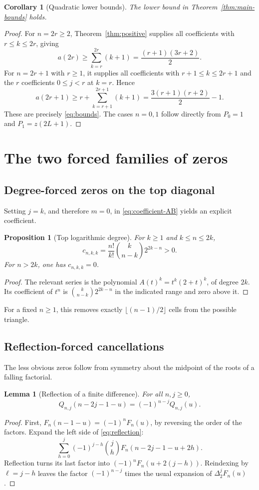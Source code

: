 \documentclass[11pt]{article}
\numberwithin{equation}{section}
\newtheorem{proposition}[theorem]{Proposition}
\newtheorem{lemma}[theorem]{Lemma}
\newtheorem{corollary}[theorem]{Corollary}
\theoremstyle{definition}
\theoremstyle{remark}
\begin{document}
\begin{corollary}[Quadratic lower bounds]\label{cor:lower}
The lower bound in Theorem~\ref{thm:main-bounds} holds.
\end{corollary}
\begin{proof}
For $n=2r\ge2$, Theorem~\ref{thm:positive} supplies all coefficients with
$r\le k\le2r$, giving
\[
 a(2r)\ge\sum_{k=r}^{2r}(k+1)=\frac{(r+1)(3r+2)}2.
\]
For $n=2r+1$ with $r\ge1$, it supplies all coefficients with
$r+1\le k\le2r+1$ and the $r$ coefficients $0\le j<r$ at $k=r$.
Hence
\[
 a(2r+1)\ge r+\sum_{k=r+1}^{2r+1}(k+1)
 =\frac{3(r+1)(r+2)}2-1.
\]
These are precisely \eqref{eq:bounds}. The cases $n=0,1$ follow directly
from $P_0=1$ and $P_1=z(2L+1)$.
\end{proof}

\section{The two forced families of zeros}\label{sec:zeros}
\subsection{Degree-forced zeros on the top diagonal}
Setting $j=k$, and therefore $m=0$, in \eqref{eq:coefficient-AB} yields
an explicit coefficient.
\begin{proposition}[Top logarithmic degree]\label{prop:top}
For $k\ge1$ and $k\le n\le2k$,
\begin{equation}\label{eq:top}
 c_{n,k,k}=\frac{n!}{k!}\binom{k}{n-k}2^{2k-n}>0.
\end{equation}
For $n>2k$, one has $c_{n,k,k}=0$.
\end{proposition}
\begin{proof}
The relevant series is the polynomial
$A(t)^k=t^k(2+t)^k$, of degree $2k$. Its coefficient of $t^n$ is
$\binom{k}{n-k}2^{2k-n}$ in the indicated range and zero above it.
\end{proof}
For a fixed $n\ge1$, this removes exactly
$\lfloor(n-1)/2\rfloor$ cells from the possible triangle.

\subsection{Reflection-forced cancellations}
The less obvious zeros follow from symmetry about the midpoint of the
roots of a falling factorial.
\begin{lemma}[Reflection of a finite difference]\label{lem:reflection}
For all $n,j\ge0$,
\begin{equation}\label{eq:reflection}
 Q_{n,j}(n-2j-1-u)=(-1)^{n-j}Q_{n,j}(u).
\end{equation}
\end{lemma}
\begin{proof}
First,
$F_n(n-1-u)=(-1)^nF_n(u)$, by reversing the order of the factors.
Expand the left side of \eqref{eq:reflection}:
\[
 \sum_{h=0}^j(-1)^{j-h}\binom jh
 F_n(n-2j-1-u+2h).
\]
Reflection turns its last factor into
$(-1)^nF_n(u+2(j-h))$. Reindexing by $\ell=j-h$ leaves the factor
$(-1)^{n-j}$ times the usual expansion of $\Delta_2^jF_n(u)$.
\end{proof}
\end{document}
